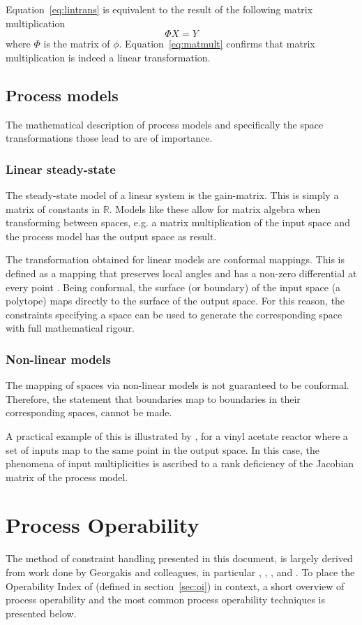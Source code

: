 Equation~\ref{eq:lintrans} is equivalent to the result of the following matrix multiplication
\begin{equation}
  \label{eq:matmult}
  \Phi X = Y
\end{equation}
where $\Phi$ is the matrix of $\phi$.
Equation~\ref{eq:matmult} confirms that matrix multiplication is indeed a linear transformation.

\subsection{Process models}
The mathematical description of process models and specifically the space transformations those lead to are of importance.

\subsubsection{Linear steady-state}
The steady-state model of a linear system is the gain-matrix.
This is simply a matrix of constants in $\mathbb{R}$.
Models like these allow for matrix algebra when transforming between spaces, e.g. a matrix multiplication of the input space and the process model has the output space as result.

The transformation obtained for linear models are conformal mappings.
This is defined as a mapping that preserves local angles and has a non-zero differential at every point \citep[514]{crcmaths}.
Being conformal, the surface (or boundary) of the input space (a polytope) maps directly to the surface of the output space.
For this reason, the constraints specifying a space can be used to generate the corresponding space with full mathematical rigour.

\subsubsection{Non-linear models}
The mapping of spaces via non-linear models is not guaranteed to be conformal.
Therefore, the statement that boundaries map to boundaries in their corresponding spaces, cannot be made.

A practical example of this is illustrated by \citet{opidealrx}, for a vinyl acetate reactor where a set of inputs map to the same point in the output space.
In this case, the phenomena of input multiplicities is ascribed to a rank deficiency of the Jacobian matrix of the process model.


\section{Process Operability}
The method of constraint handling presented in this document, is largely derived from work done by Georgakis and colleagues, in particular \citet{vinsonphd}, \citet{vinsonartoi}, \citet{limaphd}, \citet{opconproc} and \citet{opidealrx}. 
To place the Operability Index of \citet{vinsonphd} (defined in section~\ref{sec:oi}) in context, a short overview of process operability and the most common process operability techniques is presented below.


